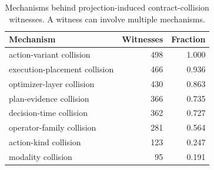 \begin{table}[t]
\centering
\caption{Mechanisms behind projection-induced contract-collision witnesses. A witness can involve multiple mechanisms.}
\label{tab:mechanism-taxonomy}
\small
\begin{tabular}{lrr}
\toprule
Mechanism & Witnesses & Fraction \\
\midrule
action-variant collision & 498 & 1.000 \\
execution-placement collision & 466 & 0.936 \\
optimizer-layer collision & 430 & 0.863 \\
plan-evidence collision & 366 & 0.735 \\
decision-time collision & 362 & 0.727 \\
operator-family collision & 281 & 0.564 \\
action-kind collision & 123 & 0.247 \\
modality collision & 95 & 0.191 \\
\bottomrule
\end{tabular}
\end{table}
